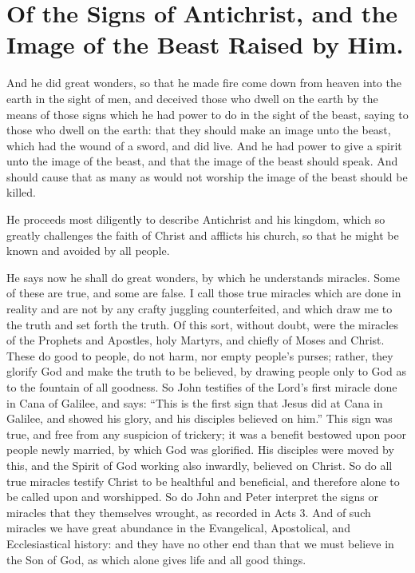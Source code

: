 \chapter[Sermon 60. Of the Signs of Antichrist, and the Image of the Beast Raised by Him.]{Of the Signs of Antichrist, and the Image of the Beast Raised by Him.}
\label{sermon:060}

And he did great wonders, so that he made fire come down from heaven into the earth in the sight of men, and deceived those who dwell on the earth by the means of those signs which he had power to do in the sight of the beast, saying to those who dwell on the earth: that they should make an image unto the beast, which had the wound of a sword, and did live. And he had power to give a spirit unto the image of the beast, and that the image of the beast should speak. And should cause that as many as would not worship the image of the beast should be killed.

He proceeds most diligently to describe Antichrist and his kingdom, which so greatly challenges the faith of Christ and afflicts his church, so that he might be known and avoided by all people.

He says now he shall do great wonders, by which he understands miracles. Some of these are true, and some are false. I call those true miracles which are done in reality and are not by any crafty juggling counterfeited, and which draw me to the truth and set forth the truth. Of this sort, without doubt, were the miracles of the Prophets and Apostles, holy Martyrs, and chiefly of Moses and Christ. These do good to people, do not harm, nor empty people's purses; rather, they glorify God and make the truth to be believed, by drawing people only to God as to the fountain of all goodness. So John testifies of the Lord’s first miracle done in Cana of Galilee, and says: “This is the first sign that Jesus did at Cana in Galilee, and showed his glory, and his disciples believed on him.” This sign was true, and free from any suspicion of trickery; it was a benefit bestowed upon poor people newly married, by which God was glorified. His disciples were moved by this, and the Spirit of God working also inwardly, believed on Christ. So do all true miracles testify Christ to be healthful and beneficial, and therefore alone to be called upon and worshipped. So do John and Peter interpret the signs or miracles that they themselves wrought, as recorded in Acts 3. And of such miracles we have great abundance in the Evangelical, Apostolical, and Ecclesiastical history: and they have no other end than that we must believe in the Son of God, as which alone gives life and all good things.

